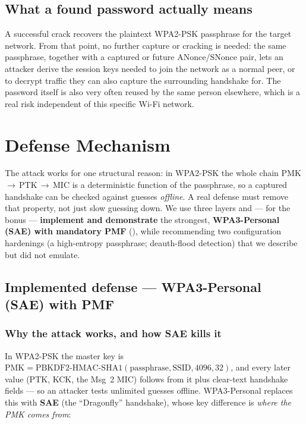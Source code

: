 \subsection{What a found password actually means}
A successful crack recovers the plaintext WPA2-PSK passphrase for the target network. From that point, no further capture or cracking is needed: the same passphrase, together with a captured or future ANonce/SNonce pair, lets an attacker derive the session keys needed to join the network as a normal peer, or to decrypt traffic they can also capture the surrounding handshake for. The password itself is also very often reused by the same person elsewhere, which is a real risk independent of this specific Wi-Fi network.

\section{Defense Mechanism}\label{sec:defense}

The attack works for one structural reason: in WPA2-PSK the whole chain PMK\,$\rightarrow$\,PTK\,$\rightarrow$\,MIC is a deterministic function of the passphrase, so a captured handshake can be checked against guesses \emph{offline}. A real defense must remove that property, not just slow guessing down. We use three layers and --- for the bonus --- \textbf{implement and demonstrate} the strongest, \textbf{WPA3-Personal (SAE) with mandatory PMF} (), while recommending two configuration hardenings (a high-entropy passphrase; deauth-flood detection) that we describe but did not emulate.

\subsection{Implemented defense --- WPA3-Personal (SAE) with PMF}

\subsubsection{Why the attack works, and how SAE kills it}
In WPA2-PSK the master key is $\text{PMK} = \text{PBKDF2-HMAC-SHA1}(\text{passphrase}, \text{SSID}, 4096, 32)$, and every later value (PTK, KCK, the Msg~2 MIC) follows from it plus clear-text handshake fields --- so an attacker tests unlimited guesses offline. WPA3-Personal replaces this with \textbf{SAE} (the ``Dragonfly'' handshake), whose key difference is \emph{where the PMK comes from}:

